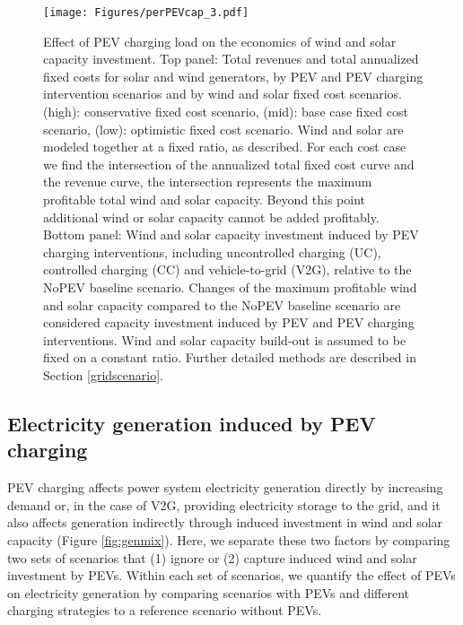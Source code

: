 \documentclass[9pt,twocolumn,twoside,lineno]{pnas-new}
\begin{document}
\begin{figure*}[!ht]
\centering
\texttt{[image: Figures/perPEVcap\_3.pdf]}
\caption{Effect of PEV charging load on the economics of wind and solar capacity investment. Top panel: Total revenues and total annualized fixed costs for solar and wind generators, by PEV and PEV charging intervention scenarios and by wind and solar fixed cost scenarios. (high): conservative fixed cost scenario, (mid): base case fixed cost scenario, (low): optimistic fixed cost scenario. Wind and solar are modeled together at a fixed ratio, as described. For each cost case we find the intersection of the annualized total fixed cost curve and the revenue curve, the intersection represents the maximum profitable total wind and solar capacity. Beyond this point additional wind or solar capacity cannot be added profitably. Bottom panel: Wind and solar capacity investment induced by PEV charging interventions, including uncontrolled charging (UC), controlled charging (CC) and vehicle-to-grid (V2G), relative to the NoPEV baseline scenario. Changes of the maximum profitable wind and solar capacity compared to the NoPEV baseline scenario are considered capacity investment induced by PEV and PEV charging interventions. Wind and solar capacity build-out is assumed to be fixed on a constant ratio. Further detailed methods are described in Section \ref{gridscenario}. }
\label{fig:capexp}
\end{figure*}

\subsection*{Electricity generation induced by PEV charging}

PEV charging affects power system electricity generation directly by increasing demand or, in the case of V2G, providing electricity storage to the grid, and it also affects generation indirectly through induced investment in wind and solar capacity (Figure \ref{fig:genmix}). Here, we separate these two factors by comparing two sets of scenarios that (1) ignore or (2) capture induced wind and solar investment by PEVs. Within each set of scenarios, we quantify the effect of PEVs on electricity generation by comparing scenarios with PEVs and different charging strategies to a reference scenario without PEVs. 
\end{document}
